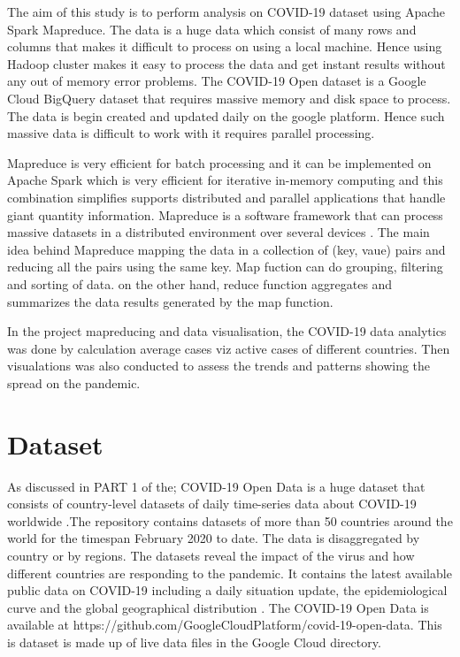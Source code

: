 \documentclass[12pt,letterpaper, twoside]{article}
\begin{document}
The aim of this study is to perform analysis on COVID-19 dataset using Apache Spark Mapreduce. The data is a huge data which consist of many rows and columns that makes it difficult to process on using a local machine. Hence using Hadoop cluster makes it easy to process the data and get instant results without any out of memory error problems. The COVID-19 Open dataset is a Google Cloud BigQuery dataset that requires massive memory and disk space to process. The data is begin created and updated daily on the google platform. Hence such massive data is difficult to work with it requires parallel processing. 

Mapreduce is very efficient for batch processing and it can be implemented on Apache Spark which is very efficient for iterative in-memory computing and this combination simplifies supports distributed and parallel applications that handle giant quantity information. Mapreduce is a software framework  that can process massive datasets in a distributed environment over several devices \cite{}. The main idea behind Mapreduce mapping the data in a collection of (key, vaue) pairs and reducing all the pairs using the same key. Map fuction can do grouping, filtering and sorting of data. on the other hand, reduce function aggregates and summarizes the data results generated by the map function. 

In the project mapreducing and data visualisation, the COVID-19 data analytics was done by calculation average cases viz active cases of different countries. Then visualations was also conducted to assess the trends and patterns showing the spread on the pandemic. 

\section{Dataset}
 As discussed in PART 1 of the;  COVID-19 Open Data is a huge dataset that consists of country-level datasets of daily time-series data about COVID-19 worldwide \cite{covid-19}.The repository contains datasets of more than 50 countries around the world for the timespan February 2020 to date. The data is disaggregated  by country or by regions. The datasets reveal the impact of the virus and how different countries are responding to the pandemic.  It contains the latest available public data on COVID-19 including a daily situation update, the epidemiological curve and the global geographical distribution \cite{covid-19}. The COVID-19 Open Data is available at https://github.com/GoogleCloudPlatform/covid-19-open-data. This is dataset is made up of live data files in the Google Cloud directory.
\end{document}
